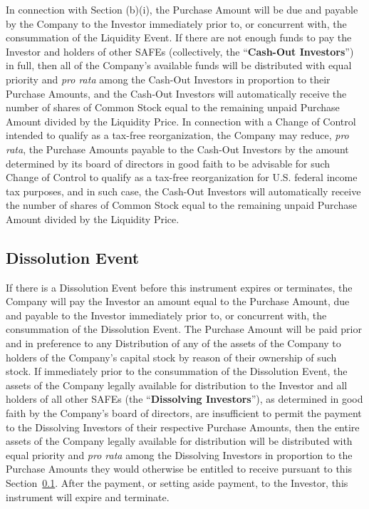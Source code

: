 \documentclass[12pt,letterpaper,fullpage]{article}
\begin{document}
\begin{sloppypar}
In connection with Section (b)(i), the Purchase Amount will be due and
payable by the Company to the Investor immediately prior to, or
concurrent with, the consummation of the Liquidity Event. If there are
not enough funds to pay the Investor and holders of other SAFEs
(collectively, the “\textbf{Cash-Out Investors}”) in full, then all of
the Company’s available funds will be distributed with equal priority and
\emph{pro rata} among the Cash-Out Investors in proportion to their
Purchase Amounts, and the Cash-Out Investors will automatically receive the
number of shares of Common Stock equal to the remaining unpaid
Purchase Amount divided by the Liquidity Price.  In connection with a
Change of Control intended to qualify as a tax-free reorganization,
the Company may reduce, \emph{pro rata}, the Purchase Amounts payable
to the Cash-Out Investors by the amount determined by its board of directors
in good faith to be advisable for such Change of Control to qualify as
a tax-free reorganization for U.S. federal income tax purposes, and in
such case, the Cash-Out Investors will automatically receive the
number of shares of Common Stock equal to the remaining unpaid
Purchase Amount divided by the Liquidity Price.
\end{sloppypar}

\subsection{Dissolution Event}
\label{sec:dissolutionevent}

\begin{sloppypar}
If there is a Dissolution Event before this instrument expires or
terminates, the Company will pay the Investor an amount equal to the
Purchase Amount, due and payable to the Investor immediately prior to,
or concurrent with, the consummation of the Dissolution Event. The
Purchase Amount will be paid prior and in preference to any
Distribution of any of the assets of the Company to holders of the
Company’s capital stock by reason of their ownership of such stock. If
immediately prior to the consummation of the Dissolution Event, the
assets of the Company legally available for distribution to the
Investor and all holders of all other SAFEs (the “\textbf{Dissolving
  Investors}”), as determined in good faith by the Company’s board of
directors, are insufficient to permit the payment to the Dissolving
Investors of their respective Purchase Amounts, then the entire assets
of the Company legally available for distribution will be distributed
with equal priority and \emph{pro rata} among the Dissolving Investors
in proportion to the Purchase Amounts they would otherwise be entitled
to receive pursuant to this Section~\ref{sec:dissolutionevent}. After
the payment, or setting aside payment, to the Investor, this
instrument will expire and terminate.
\end{sloppypar}
\end{document}

